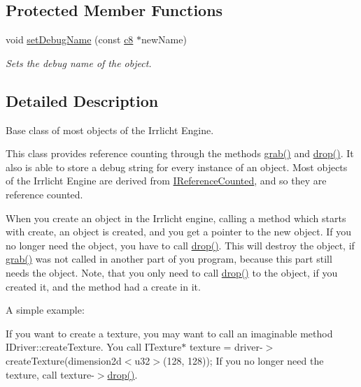 \subsection*{Protected Member Functions}
\begin{DoxyCompactItemize}
\item 
void \hyperlink{classirr_1_1IReferenceCounted_a704c5042d399fe8cd3bdd65a0559002a}{set\+Debug\+Name} (const \hyperlink{namespaceirr_a9395eaea339bcb546b319e9c96bf7410}{c8} $\ast$new\+Name)
\begin{DoxyCompactList}\small\item\em Sets the debug name of the object. \end{DoxyCompactList}\end{DoxyCompactItemize}


\subsection{Detailed Description}
Base class of most objects of the Irrlicht Engine. 

This class provides reference counting through the methods \hyperlink{classirr_1_1IReferenceCounted_a396f9cdbe311ada278626477b3c6f0f5}{grab()} and \hyperlink{classirr_1_1IReferenceCounted_a03856a09355b89d178090c4a5f738543}{drop()}. It also is able to store a debug string for every instance of an object. Most objects of the Irrlicht Engine are derived from \hyperlink{classirr_1_1IReferenceCounted}{I\+Reference\+Counted}, and so they are reference counted.

When you create an object in the Irrlicht engine, calling a method which starts with \textquotesingle{}create\textquotesingle{}, an object is created, and you get a pointer to the new object. If you no longer need the object, you have to call \hyperlink{classirr_1_1IReferenceCounted_a03856a09355b89d178090c4a5f738543}{drop()}. This will destroy the object, if \hyperlink{classirr_1_1IReferenceCounted_a396f9cdbe311ada278626477b3c6f0f5}{grab()} was not called in another part of you program, because this part still needs the object. Note, that you only need to call \hyperlink{classirr_1_1IReferenceCounted_a03856a09355b89d178090c4a5f738543}{drop()} to the object, if you created it, and the method had a \textquotesingle{}create\textquotesingle{} in it.

A simple example\+:

If you want to create a texture, you may want to call an imaginable method I\+Driver\+::create\+Texture. You call I\+Texture$\ast$ texture = driver-\/$>$create\+Texture(dimension2d$<$u32$>$(128, 128)); If you no longer need the texture, call texture-\/$>$\hyperlink{classirr_1_1IReferenceCounted_a03856a09355b89d178090c4a5f738543}{drop()}.

